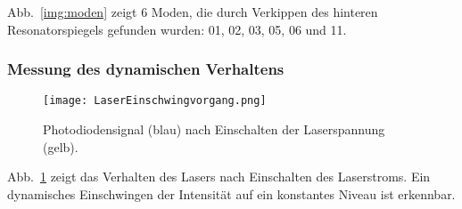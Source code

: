 Abb.~\ref{img:moden} zeigt 6 Moden, die durch Verkippen des hinteren Resonatorspiegels gefunden
wurden: 01, 02, 03, 05, 06 und 11.


\subsubsection{Messung des dynamischen Verhaltens}

\begin{figure}[H]
\begin{center}
  \texttt{[image: LaserEinschwingvorgang.png]}
  \caption{Photodiodensignal (blau) nach Einschalten der Laserspannung (gelb).}
  \label{img:Einschwingen}
\end{center}
\end{figure}

Abb.~\ref{img:Einschwingen} zeigt das Verhalten des Lasers nach Einschalten des Laserstroms.
Ein dynamisches Einschwingen der Intensität auf ein konstantes Niveau ist erkennbar.

